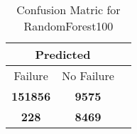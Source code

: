 \begin{table}[] 
\caption{Confusion Matric for RandomForest100} 
\label{Table: Prediction Accuracy-NoneRandomForest100RandomForest100EKF-ignoreReflection-Reflection} 
\centering 
\begin{tabular} 
 {@{}ccc@{}} 
\toprule 
\multicolumn{2}{c}{\textbf{Predicted}}
 \\ \midrule 
\multicolumn{1}{|c|}{Failure} & 
\multicolumn{1}{c|}{No Failure}
 \\ \midrule 
\multicolumn{1}{|c|}{\color{green}\textbf{151856}} & 
\multicolumn{1}{c|}{\color{green}\textbf{9575}}
 \\ \midrule 
\multicolumn{1}{|c|}{\color{red}\textbf{228}} & 
\multicolumn{1}{c|}{\color{red}\textbf{8469}}
 \\ \bottomrule 
\end{tabular} 
\end{table} 
